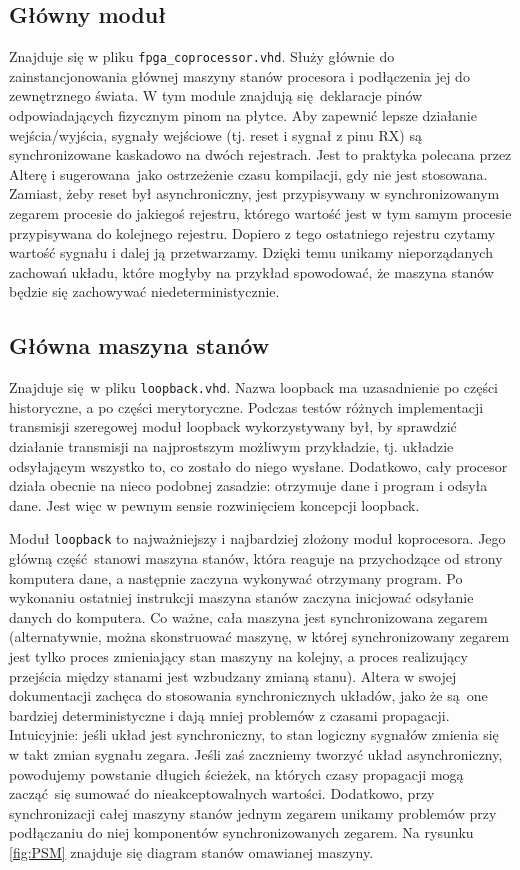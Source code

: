 \subsection{Główny moduł}

Znajduje się w pliku \texttt{fpga\_coprocessor.vhd}. Służy głównie do zainstancjonowania głównej maszyny stanów procesora i podłączenia jej do zewnętrznego świata. W tym module znajdują się deklaracje pinów odpowiadających fizycznym pinom na płytce. Aby zapewnić lepsze działanie wejścia/wyjścia, sygnały wejściowe (tj. reset i sygnał z pinu RX) są synchronizowane kaskadowo na dwóch rejestrach. Jest to praktyka polecana przez Alterę i sugerowana jako ostrzeżenie czasu kompilacji, gdy nie jest stosowana. Zamiast, żeby reset był asynchroniczny, jest przypisywany w synchronizowanym zegarem procesie do jakiegoś rejestru, którego wartość jest w tym samym procesie przypisywana do kolejnego rejestru. Dopiero z tego ostatniego rejestru czytamy wartość sygnału i dalej ją przetwarzamy. Dzięki temu unikamy nieporządanych zachowań układu, które mogłyby na przykład spowodować, że maszyna stanów będzie się zachowywać niedeterministycznie.


\subsection{Główna maszyna stanów}

Znajduje się w pliku \texttt{loopback.vhd}. Nazwa loopback ma uzasadnienie po części historyczne, a po części merytoryczne. Podczas testów różnych implementacji transmisji szeregowej moduł loopback wykorzystywany był, by sprawdzić działanie transmisji na najprostszym możliwym przykładzie, tj. układzie odsyłającym wszystko to, co zostało do niego wysłane. Dodatkowo, cały procesor działa obecnie na nieco podobnej zasadzie: otrzymuje dane i program i odsyła dane. Jest więc w pewnym sensie rozwinięciem koncepcji loopback.

Moduł \texttt{loopback} to najważniejszy i najbardziej złożony moduł koprocesora. Jego główną część stanowi maszyna stanów, która reaguje na przychodzące od strony komputera dane, a następnie zaczyna wykonywać otrzymany program. Po wykonaniu ostatniej instrukcji maszyna stanów zaczyna inicjować odsyłanie danych do komputera. Co ważne, cała maszyna jest synchronizowana zegarem (alternatywnie, można skonstruować maszynę, w której synchronizowany zegarem jest tylko proces zmieniający stan maszyny na kolejny, a proces realizujący przejścia między stanami jest wzbudzany zmianą stanu). Altera w swojej dokumentacji zachęca do stosowania synchronicznych układów, jako że są one bardziej deterministyczne i dają mniej problemów z czasami propagacji. Intuicyjnie: jeśli układ jest synchroniczny, to stan logiczny sygnałów zmienia się w takt zmian sygnału zegara. Jeśli zaś zaczniemy tworzyć układ asynchroniczny, powodujemy powstanie długich ścieżek, na których czasy propagacji mogą zacząć się sumować do nieakceptowalnych wartości. Dodatkowo, przy synchronizacji całej maszyny stanów jednym zegarem unikamy problemów przy podłączaniu do niej komponentów synchronizowanych zegarem. Na rysunku \ref{fig:PSM} znajduje się diagram stanów omawianej maszyny. 


